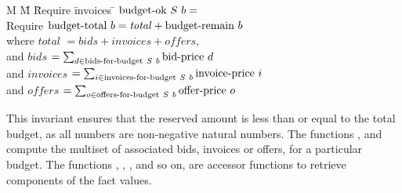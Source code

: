 \begin{tabbing}
M \= M \= Require \= invoices \= \kill
\> $\textrm{budget-ok}~{S}~b = $ \\
\> \> Require \> $\textrm{budget-total}~b = \mathit{total} + \textrm{budget-remain}~b$ \\
\> \> where \> $\mathit{total}$ \> $= \mathit{bids} + \mathit{invoices} + \mathit{offers}$, \\
\> \> and \> $\mathit{bids}$ \> $= \sum_{d \in \textrm{bids-for-budget}~S~b} \textrm{bid-price}~d$ \\
\> \> and \> $\mathit{invoices}$ \> $= \sum_{i \in \textrm{invoices-for-budget}~S~b} \textrm{invoice-price}~i$ \\
\> \> and \> $\mathit{offers}$ \> $= \sum_{o \in \textrm{offers-for-budget}~S~b} \textrm{offer-price}~o$ \\
\end{tabbing}

This invariant ensures that the reserved amount is less than or equal to the total budget, as all numbers are non-negative natural numbers.
The functions ,  and  compute the multiset of associated bids, invoices or offers, for a particular budget. 
The functions , , , and so on, are accessor functions to retrieve components of the fact values.
